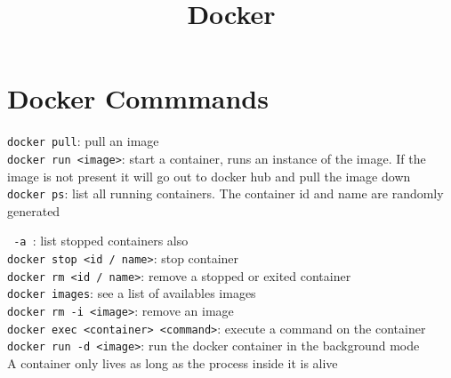 \documentclass[french]{article}
\title{Docker}
\begin{document}
\date{}

\maketitle

\section{Docker Commmands}

\verb|docker pull|: pull an image\\

\verb|docker run <image>|: start a container, runs an instance of the image. If the image is not present it will go out to docker hub and pull the image down\\

\verb|docker ps|: list all running containers. The container id and name are randomly generated

\verb| -a |: list stopped containers also\\

\verb|docker stop <id / name>|: stop container\\

\verb|docker rm <id / name>|: remove a stopped or exited container\\

\verb|docker images|: see a list of availables images\\

\verb|docker rm -i <image>|: remove an image\\

\verb|docker exec <container> <command>|: execute a command on the container\\

\verb|docker run -d <image>|: run the docker container in the background mode\\

A container only lives as long as the process inside it is alive
\end{document}
